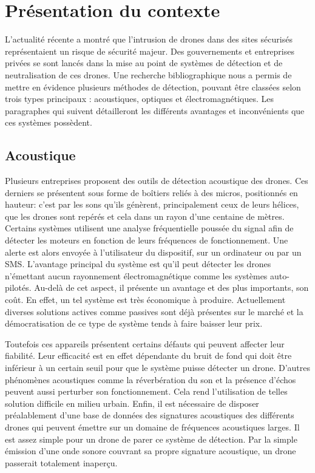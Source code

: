 

\chapter{Présentation du contexte}

L'actualité récente a montré que l'intrusion de drones dans des sites sécurisés représentaient un risque de sécurité majeur. Des gouvernements et entreprises privées se sont lancés dans la mise au point de systèmes de détection et de neutralisation de ces drones. Une recherche bibliographique nous a permis de mettre en évidence plusieurs méthodes de détection, pouvant être classées selon trois types principaux : acoustiques, optiques et électromagnétiques.  
Les paragraphes qui suivent détailleront les différents avantages et inconvénients que ces systèmes possèdent.

\section{Acoustique}

Plusieurs entreprises proposent des outils de détection acoustique des drones. Ces derniers se présentent sous forme de boîtiers reliés à des micros, positionnés en hauteur: c'est par les sons qu'ils génèrent, principalement ceux de leurs hélices, que les drones sont repérés et cela dans un rayon d'une centaine de mètres. Certains systèmes utilisent une analyse fréquentielle poussée du signal afin de détecter les moteurs en fonction de leurs fréquences de fonctionnement. Une alerte est alors envoyée à l'utilisateur du dispositif, sur un ordinateur ou par un SMS. L'avantage principal du système est qu'il peut détecter les drones n'émettant aucun rayonnement électromagnétique comme les systèmes auto-pilotés. Au-delà de cet aspect, il présente un avantage et des plus importants, son coût. En effet, un tel système est très économique à produire. Actuellement diverses solutions actives comme passives sont déjà présentes sur le marché et la démocratisation de ce type de système tends à faire baisser leur prix.

Toutefois ces appareils présentent certains défauts qui peuvent affecter leur fiabilité. Leur efficacité est en effet dépendante du bruit de fond qui doit être inférieur à un certain seuil pour que le système puisse détecter un drone. D'autres phénomènes acoustiques comme la réverbération du son et la présence d'échos peuvent aussi perturber son fonctionnement. Cela rend l'utilisation de telles solution difficile en milieu urbain. Enfin, il est nécessaire de disposer préalablement d'une base de données des signatures acoustiques des différents drones qui peuvent émettre sur un domaine de fréquences acoustiques larges. Il est assez simple pour un drone de parer ce système de détection. Par la simple émission d'une onde sonore couvrant sa propre signature acoustique, un drone passerait totalement inaperçu.

